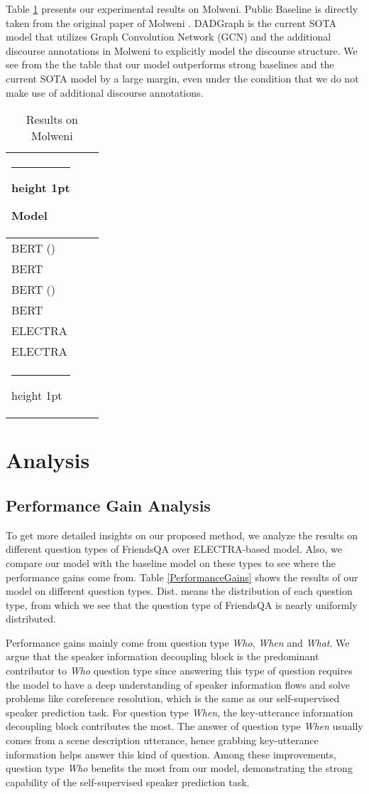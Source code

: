 \documentclass[11pt]{article}
\makeatletter
\newcommand{\thickhline}{\noalign {\ifnum 0=`}\fi \hrule height 1pt
	\futurelet \reserved@a \@xhline
}
\makeatother
\begin{document}
	Table \ref{MolweniResult} presents our experimental results on Molweni. Public Baseline is directly taken from the original paper of Molweni \citep{li2020molweni}. DADGraph \citep{li2021dadgraph} is the current SOTA model that utilizes Graph Convolution Network (GCN) and the additional discourse annotations in Molweni to explicitly model the discourse structure. We see from the the table that our model outperforms strong baselines and the current SOTA model by a large margin, even under the condition that we do not make use of additional discourse annotations.
	\begin{table}[htbp]
		\centering
		\begin{tabular}{l c c}
			\thickhline
			Model &  & \\
			\hline \hline
			BERT (\citeauthor{li2020molweni}) &  & \\
			BERT &  & \\
			BERT (\citeauthor{li2021dadgraph}) &  & \\
			BERT &  & \\
			\hline
			ELECTRA &  & \\
			ELECTRA &  & \\
			\thickhline
		\end{tabular}
		\caption{Results on Molweni}
		\label{MolweniResult}
	\end{table}
	
	\section{Analysis}
	\subsection{Performance Gain Analysis}
	To get more detailed insights on our proposed method, we analyze the results on different question types of FriendsQA over ELECTRA-based model. Also, we compare our model with the baseline model on these types to see where the performance gains come from. Table \ref{PerformanceGains} shows the results of our model on different question types. Dist. means the distribution of each question type, from which we see that the question type of FriendsQA is nearly uniformly distributed. 
	
	Performance gains mainly come from question type \emph{Who}, \emph{When} and \emph{What}. We argue that the speaker information decoupling block is the predominant contributor to \emph{Who} question type since answering this type of question requires the model to have a deep understanding of speaker information flows and solve problems like coreference resolution, which is the same as our self-supervised speaker prediction task. For question type \emph{When}, the key-utterance information decoupling block contributes the most. The answer of question type \emph{When} usually comes from a scene description utterance, hence grabbing key-utterance information helps answer this kind of question. Among these improvements, question type \emph{Who} benefits the most from our model, demonstrating the strong capability of the self-supervised speaker prediction task.
	
\end{document}
